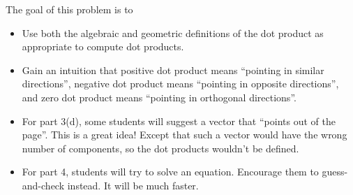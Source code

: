 
	\question
	\begin{annotation}
		\begin{goals}

			The goal of this problem is to
			\begin{itemize}
				\item Use both the algebraic and geometric definitions of the dot product
					as appropriate to compute dot products.
				\item Gain an intuition that positive dot product
					means ``pointing in similar directions'', negative dot product
					means ``pointing in opposite directions'', and zero dot product
					means ``pointing in orthogonal directions''.
			\end{itemize}
		\end{goals}

		\begin{notes}
			\begin{itemize}
				\item For part 3(d), some students will suggest a vector
					that ``points out of the page''. This is a great idea!
					Except that such a vector would have the wrong number of components,
					so the dot products wouldn't be defined.
				\item For part 4, students will try to solve an equation. Encourage them
					to guess-and-check instead. It will be much faster.
			\end{itemize}
		\end{notes}
	\end{annotation}

